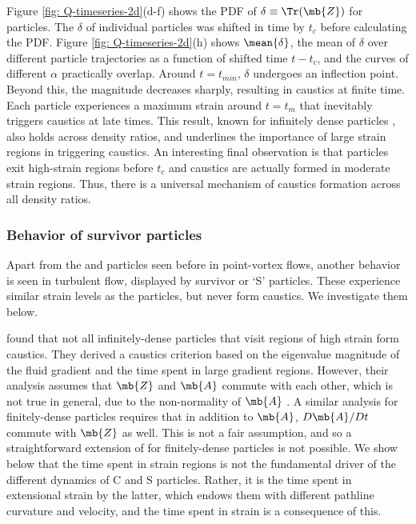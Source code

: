 Figure \ref{fig: Q-timeseries-2d}(d-f) shows the PDF of $\delta \equiv \Tr(\mb{Z})$ for \cs particles. The $\delta$ of individual particles was shifted in time by $t_c$ before calculating the PDF. Figure \ref {fig: Q-timeseries-2d}(h) shows $\mean{\delta}$, the mean of $\delta$ {over different particle trajectories as a function of shifted time $t-t_c$}, and the curves of different $\alpha$ practically overlap. Around $t=t_{min}$, $\delta$ undergoes an inflection point. Beyond this, the magnitude decreases sharply, resulting in caustics at finite time. {Each particle experiences a maximum strain around $t = t_m$ that inevitably} triggers caustics at late times. This result, known for infinitely dense particles \cite{meibohm2023,batge2023,zhang2025}, also holds across density ratios, and underlines the importance of large strain regions in triggering caustics. An interesting final observation is that particles exit high-strain regions before $t_c$ and caustics are actually formed in moderate strain regions. Thus, there is a universal mechanism of caustics formation across all density ratios.

\subsubsection{Behavior of survivor \su particles}\label{nc-dets}
Apart from the \cs and \es particles seen before in point-vortex flows, another behavior is seen in turbulent flow, displayed by survivor or `S' particles. These experience similar strain levels as the \cs particles, but never form caustics. We investigate them  below.

\citet{batge2023} found that not all infinitely-dense particles that visit regions of high strain form caustics. They derived a caustics criterion based on the eigenvalue magnitude of the fluid gradient and the time spent in large gradient regions. However, their analysis assumes that $\mb{Z}$ and $\mb{A}$ commute with each other, which is not true in general, due to the non-normality of $\mb{A}$ \cite{kronborg2023}. A similar analysis for finitely-dense particles requires that in addition to $\mb{A}$, $D\mb{A}/Dt$ commute with $\mb{Z}$ as well. This is not a fair assumption, and so a straightforward extension of \cite{batge2023} for finitely-dense particles is not possible. We show below that the time spent in strain regions is not the fundamental driver of the different dynamics of C and S particles. Rather, it is the time spent in extensional strain by the latter, which endows them with different pathline curvature and velocity, and the time spent in strain is a consequence of this.

